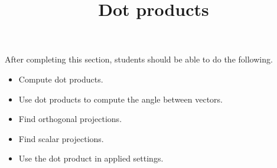 \documentclass{ximera}
\title{Dot products}
\begin{document}
\begin{abstract}
\end{abstract}

\maketitle

\begin{sectionOutcomes}

After completing this section, students should be able to do the following.

\begin{itemize}
\item Compute dot products.
\item Use dot products to compute the angle between vectors.
\item Find orthogonal projections.
\item Find scalar projections.
\item Use the dot product in applied settings. 
\end{itemize}

\end{sectionOutcomes}
\end{document}
